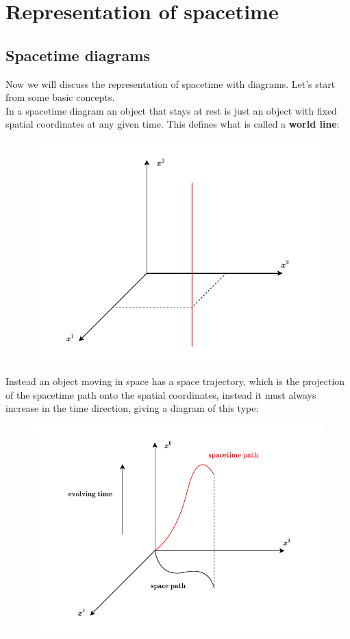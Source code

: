 \chapter{Representation of spacetime}
\section{Spacetime diagrams}
Now we will discuss the representation of spacetime with diagrams. Let's start from some basic concepts.\\
In a spacetime diagram an object that stays at rest is just an object with fixed spatial coordinates at any given time. This defines what is called a \textbf{world line}:
\begin{figure}[H]
  \centering
  \includegraphics[width=0.8\linewidth]{res/svg/World_line.drawio}
\end{figure}
Instead an object moving in space has a space trajectory, which is the projection of the spacetime path onto the spatial coordinates, instead it must always increase in the time direction, giving a diagram of this type:
\begin{figure}[H]
  \centering
  \includegraphics[width=0.8\linewidth]{res/svg/spacetime_path.drawio}
\end{figure}
